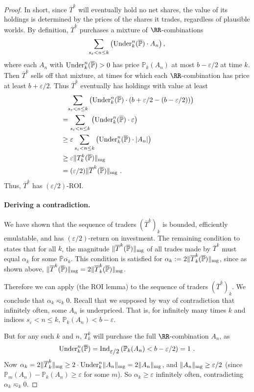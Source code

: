 \documentclass[authordate,onecolumn,noenvironments]{miri-tech-article}
\numberwithin{equation}{subsection}
\newcommand{\seq}[1]{{\overline{#1}}}
\newcommand{\pgenable}{\ensuremath{\MP}\text{-generable}\xspace}
\newcommand{\aff}{A}
\newcommand{\trade}{T}%
\newcommand{\Trader}{\seq{\trade}} %
\newcommand{\magnit}[1]{{\|#1\|_{\rm mg}}} %
\newcommand{\BelState}{\mathbb{P}}
\newcommand{\pt}{\BelState}
\newcommand{\MP}{\seq{\pt}}
\newcommand{\ftn}{(\MP)} %
\newcommand{\underpriced}{{\rm Under}}
\newcommand{\localportfoliovalue}{b}
\newcommand{\ctsind}[1]{\operatorname{Ind}_{\text{\small{${#1}$}}}} %
\begin{document}
\begin{proof}
In short, since  $\Trader^k$ will eventually hold no net  shares, the value of its holdings is determined by the prices of the shares
it trades, regardless of plausible worlds. By definition, $\Trader^k$ purchases a mixture of $\RR$-combinations
%
\[ \sum_{s_\varepsilon < n\le k} \left( \underpriced_k^n \ftn \cdot \aff_n \right)    , \]
%
where each $\aff_n$ with $\underpriced_k^n \ftn >0$
has price $\pt_k(\aff_n)$ at most $\localportfoliovalue -\varepsilon/2$ at time $k$.
Then $\Trader^k$ sells off that mixture, at times for which each $\RR$-combination has price
at least $\localportfoliovalue +\varepsilon/2$. Thus $\Trader^k$ eventually has holdings with value at least 
%
\begin{align*}
&\;\;\;\sum_{s_\varepsilon < n\le k} \left( \underpriced_k^n(\MP) \cdot \left(  \localportfoliovalue +\varepsilon/2 - (\localportfoliovalue -\varepsilon/2) \right) \right) \\ 
&= \sum_{s_\varepsilon < n\le k} \left( \underpriced_k^n(\MP)\cdot  \varepsilon \right)  \\
&\geq \varepsilon \sum_{s_\varepsilon < n\le k} \left( \underpriced_k^n(\MP) \cdot |\aff_n| \right)    \\
&\geq \varepsilon \magnit{\trade^k_k\ftn} \\ 
&= (\varepsilon/2 ) \magnit{\Trader^k\ftn} \ . 
\end{align*}
%
Thus, $\Trader^k$ 
 has $(\varepsilon/2)$-ROI\@. 


\paragraph{Deriving a contradiction.}


We have shown that the sequence of traders $(\Trader^k)_k$ is bounded, efficiently emulatable, and has $(\varepsilon/2)$-return on investment. 
The remaining condition to 
states that for all $k$, the magnitude $\magnit{\Trader^k(\MP)}$ of all trades made by $\Trader^k$ must equal $\alpha_k$ for some \pgenable $\seq{\alpha_k}$. This condition is satisfied for $\alpha_k := 2\magnit{\Trader^k_k(\MP)}$, since as
shown above, $\magnit{\Trader^k(\MP)} = 2\magnit{\Trader^k_k(\MP)}$. 


Therefore we can apply  (the ROI lemma) to the sequence of traders $(\Trader^k)_k$. We conclude that $\alpha_k \eqsim_k 0$.
Recall that we supposed by way of contradiction that infinitely often, 
some $\aff_n$ is underpriced. That is, for infinitely many times $k$ and indices
$s_\varepsilon < n\le k$,
$\pt_{k}(\aff_n)< \localportfoliovalue - \varepsilon$. 


But for any such $k $ and $n$, $\trade^k_k$ will purchase the full  $\RR$-combination $\aff_{n}$, as
%
\[ \underpriced_k^n (\MP)
= \ctsind{\varepsilon/2}\left( \pt_{k}(\aff_n)  < \localportfoliovalue - \varepsilon/2\right) = 1 \ . \]
%
Now $\alpha_k = 2 \magnit{\Trader^k_k} \geq 2 \cdot \underpriced_k^n \magnit{\aff_n} =2 \magnit{\aff_n}$, and $\magnit{\aff_n} \geq \varepsilon/2$
(since $\pt_m(\aff_n) - \pt_k(\aff_n) \geq \varepsilon$ for some $m$).
So $\alpha_k \geq \varepsilon$ infinitely often, contradicting $\alpha_k \eqsim_k 0$.
\end{proof}
\end{document}
